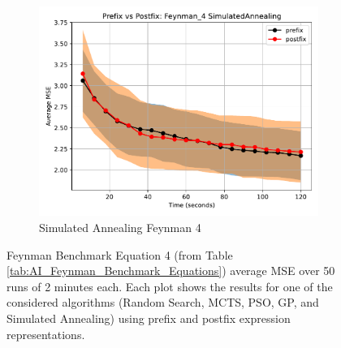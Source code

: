 \documentclass[runningheads]{llncs}
\begin{document}
\begin{figure}
    \vspace{0.5cm}
    
    \begin{subfigure}[b]{0.4\textwidth}
        \includegraphics[width=\linewidth, keepaspectratio]{AIFeynman_Benchmarks/PrePostFeynman_4SimulatedAnnealing.pdf}
        \caption{Simulated Annealing Feynman 4}
        \label{subfig:feynman_4_SA}
    \end{subfigure}
    
    \caption{Feynman Benchmark Equation 4 (from Table \ref{tab:AI_Feynman_Benchmark_Equations}) average MSE over 50 runs of 2 minutes each. Each plot shows the results for one of the considered algorithms (Random Search, MCTS, PSO, GP, and Simulated Annealing) using prefix and postfix expression representations.}
    \label{fig:AIFeynman_4_Benchmarks}
\end{figure}
\end{document}
